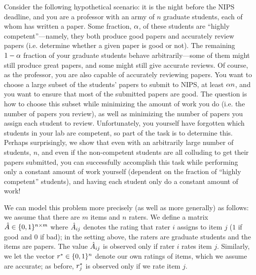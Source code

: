 Consider the following hypothetical scenario: it is the night before the 
NIPS deadline, and you are a professor with an army of $n$ graduate students, 
each of whom has written a paper.  Some fraction, $\alpha$, of these 
students are ``highly competent''---namely, they both produce good papers and 
accurately review papers (i.e. determine whether a given paper is good 
or not).  The remaining $1-\alpha$ fraction of your graduate students 
behave arbitrarily---some of them might still produce great papers, and some 
might still give accurate reviews.  Of course, as the professor, you are also 
capable of accurately reviewing papers.  You want to choose a large subset of 
the students' papers to submit to NIPS, at least $\alpha n$, and you want 
to ensure that most of the submitted papers are good.  The question is how to 
choose this subset while minimizing the amount of work you do (i.e. the number 
of papers you review), as well as minimizing the number of papers you assign 
each student to review. Unfortunately, you yourself have forgotten which students 
in your lab are competent, so part of the task is to determine this.
%
Perhaps surprisingly, we show that even with an arbitrarily large number of 
students, $n$, and even if the non-competent students are all colluding to 
get their papers submitted, you can successfully accomplish this task while 
performing only a constant amount of work yourself (dependent on the fraction 
of ``highly competent'' students), and having each student only do a constant 
amount of work!

We can model this problem more precisely (as well as more generally) as follows: 
we assume that there are $m$ items and $n$ raters. We define a matrix 
$\hat{A} \in \{0,1\}^{n \times m}$ where $\hat{A}_{ij}$ denotes the rating that 
rater $i$ assigns to item $j$ ($1$ if good and $0$ if bad); in the setting above, 
the raters are graduate students and the items are papers. 
The value $\hat{A}_{ij}$ is observed only if rater $i$ rates item $j$. 
Similarly, we let the vector $r^* \in \{0,1\}^n$ denote 
our own ratings of items, which we assume are accurate; as before, 
$r^*_{j}$ is observed only if we rate item $j$.

